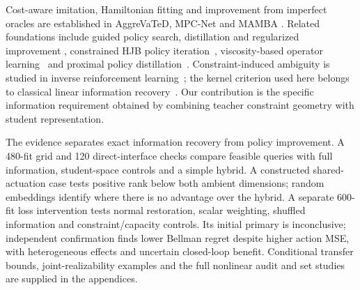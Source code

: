 Cost-aware imitation, Hamiltonian fitting and improvement from imperfect
oracles are established in AggreVaTeD, MPC-Net and MAMBA
\cite{sun2017aggrevated,carius2020mpcnet,cheng2020mamba}. Related foundations
include guided policy search, distillation and regularized improvement
\cite{levine2013guided,czarnecki2019distilling,abdolmaleki2018mpo,geist2019regularized},
constrained HJB policy iteration~\cite{kundu2024policy}, viscosity-based
operator learning~\cite{lee2025pideeponet} and proximal policy
distillation~\cite{spigler2025ppd}. Constraint-induced ambiguity is studied
in inverse reinforcement learning~\cite{schlaginhaufen2023identifiability};
the kernel criterion used here belongs to classical linear information
recovery~\cite{pinkus1986recovery,foucart2021recovery}. Our contribution
is the specific information requirement obtained by combining teacher
constraint geometry with student representation.

The evidence separates exact information recovery from policy improvement.
A 480-fit grid and 120 direct-interface checks compare feasible queries
with full information, student-space controls and a simple hybrid.
A constructed shared-actuation case tests positive rank below both
ambient dimensions; random embeddings identify where there is no
advantage over the hybrid. A separate 600-fit loss intervention tests
normal restoration, scalar weighting, shuffled information and
constraint/capacity controls. Its initial primary is inconclusive;
independent confirmation finds lower Bellman regret despite higher
action MSE, with heterogeneous effects and uncertain closed-loop benefit.
Conditional transfer bounds, joint-realizability examples and the full
nonlinear audit and set studies are supplied in the appendices.

